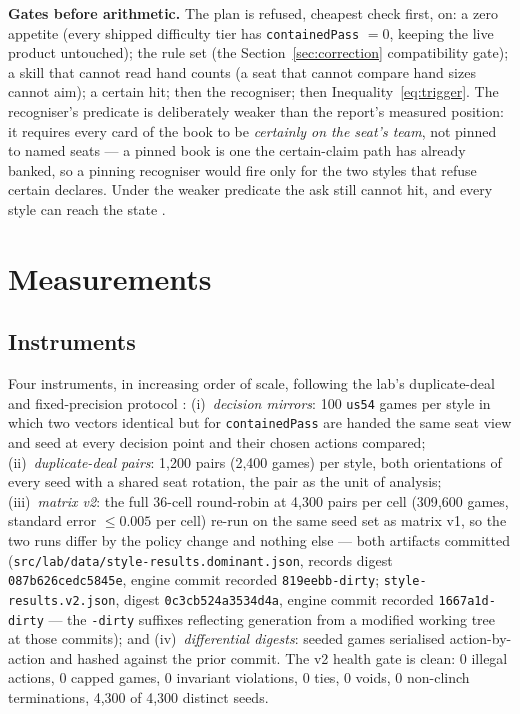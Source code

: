 \documentclass[11pt]{article}
\newcommand{\code}[1]{\texttt{#1}}
\begin{document}
\textbf{Gates before arithmetic.} The plan is refused, cheapest check first,
on: a zero appetite (every shipped difficulty tier has \code{containedPass}
$= 0$, keeping the live product untouched); the rule set (the
Section~\ref{sec:correction} compatibility gate); a skill that cannot read
hand counts (a seat that cannot compare hand sizes cannot aim); a certain hit;
then the recogniser; then Inequality~\eqref{eq:trigger}. The recogniser's
predicate is deliberately weaker than the report's measured position: it
requires every card of the book to be \emph{certainly on the seat's team},
not pinned to named seats --- a pinned book is one the certain-claim path has
already banked, so a pinning recogniser would fire only for the two styles
that refuse certain declares. Under the weaker predicate the ask still cannot
hit, and every style can reach the state \cite{contained-ts}.

\section{Measurements}
\label{sec:measure}

\subsection{Instruments}
\label{sec:instruments}

Four instruments, in increasing order of scale, following the lab's
duplicate-deal and fixed-precision protocol \cite{styles,botlab}:
(i)~\emph{decision mirrors}: 100 \code{us54} games per style in which two
vectors identical but for \code{containedPass} are handed the same seat view
and seed at every decision point and their chosen actions compared;
(ii)~\emph{duplicate-deal pairs}: 1{,}200 pairs (2{,}400 games) per style,
both orientations of every seed with a shared seat rotation, the pair as the
unit of analysis; (iii)~\emph{matrix v2}: the full $36$-cell round-robin at
4{,}300 pairs per cell (309{,}600 games, standard error $\le 0.005$ per cell)
re-run on the same seed set as matrix v1, so the two runs differ by the policy
change and nothing else --- both artifacts committed
(\code{src/lab/data/style-results.dominant.json}, records digest
\code{087b626cedc5845e}, engine commit recorded \code{819eebb-dirty};
\code{style-results.v2.json}, digest \code{0c3cb524a3534d4a}, engine commit
recorded \code{1667a1d-dirty} --- the \code{-dirty} suffixes reflecting
generation from a modified working tree at those commits); and
(iv)~\emph{differential digests}: seeded games
serialised action-by-action and hashed against the prior commit. The v2 health
gate is clean: 0 illegal actions, 0 capped games, 0 invariant violations, 0
ties, 0 voids, 0 non-clinch terminations, 4{,}300 of 4{,}300 distinct seeds.
\end{document}
